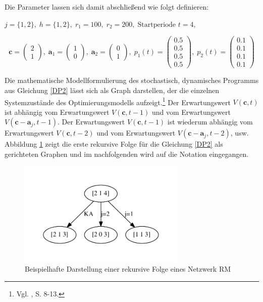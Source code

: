 Die Parameter lassen sich damit abschließend wie folgt definieren:
\begin{center}
$j = \{1, 2\}, \; h = \{1, 2\}, \; r_{1} = 100, \; r_{2} = 200, \; \text{Startperiode } t=4$,
\end{center}
\[
    \textbf{c}=\begin{pmatrix} 2 \\ 1 \end{pmatrix}, \;
    \textbf{a}_1=\begin{pmatrix} 1 \\ 0 \end{pmatrix}, \;
     \textbf{a}_2=\begin{pmatrix} 0 \\ 1 \end{pmatrix}, \;
     p_{1}(t)=\begin{pmatrix} 0.5\\ 0.5\\ 0.5\\ 0.5  \end{pmatrix}, \;
     p_{2}(t)=\begin{pmatrix} 0.1\\ 0.1\\ 0.1\\ 0.1  \end{pmatrix}
  \]

Die mathematische Modellformulierung des stochastisch, dynamisches Programms aus Gleichung \eqref{DP2} lässt sich als Graph darstellen, der die einzelnen Systemzustände des Optimierungsmodells aufzeigt.\footnote{Vgl. \cite{demiguel2006multistage}, S. 8-13.} Der Erwartungswert $V(\textbf{c},t)$ ist abhängig vom Erwartungswert $V(\textbf{c},t-1)$ und vom Erwartungswert $V(\textbf{c}-\textbf{a}_{j},t-1)$. Der Erwartungswert $V(\textbf{c},t-1)$ ist wiederum abhängig vom Erwartungswert $V(\textbf{c},t-2)$ und vom Erwartungswert $V(\textbf{c}-\textbf{a}_{j},t-2)$, usw. Abbildung \ref{B0} zeigt die erste rekursive Folge für die Gleichung \eqref{DP2} als gerichteten Graphen und im nachfolgenden wird auf die Notation eingegangen.
\begin{figure}[h!]
  \begin{center}
    \includegraphics[width=80mm]{Bilder/Beispiel0.pdf}
    \caption{Beispielhafte Darstellung einer rekursive Folge eines Netzwerk RM}  \label{B0}
  \end{center}
\end{figure}

